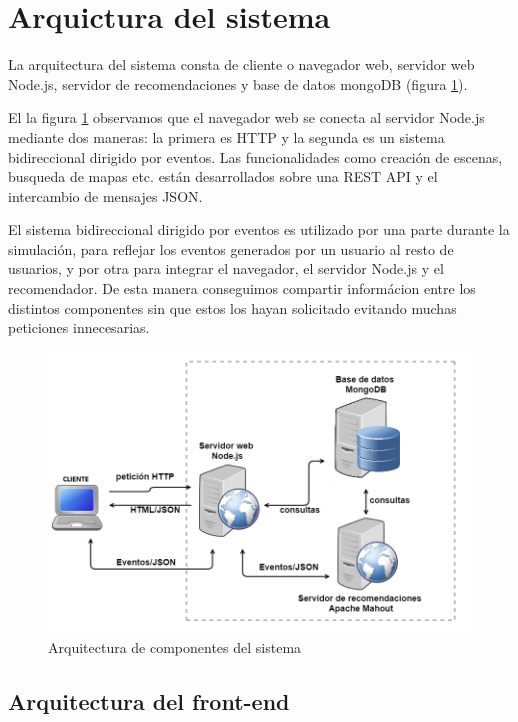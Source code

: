 \newpage


\section{Arquictura del sistema}


La arquitectura del sistema consta de cliente o navegador web, servidor web Node.js, servidor de recomendaciones y base de datos mongoDB (figura \ref{arquitecturaComponentes}).

El la figura \ref{arquitecturaComponentes} observamos que el navegador web se conecta al servidor Node.js mediante dos maneras: la primera es HTTP y la segunda es un sistema bidireccional dirigido por eventos. Las funcionalidades como creación de escenas, busqueda de mapas etc. están desarrollados sobre una REST API y el intercambio de mensajes JSON.

El sistema bidireccional dirigido por eventos es utilizado por una parte durante la simulación, para reflejar los eventos generados por un usuario al resto de usuarios, y por otra para integrar el navegador, el servidor Node.js y el recomendador. De esta manera conseguimos compartir informácion entre los distintos componentes sin que estos los hayan solicitado evitando muchas peticiones innecesarias.

\begin{figure}[H]
\centering\includegraphics[scale=0.55]{imagenes/arquitectura-componentes.png}
\caption{Arquitectura de componentes del sistema}
\label{arquitecturaComponentes}
\end{figure}

\newpage


\subsection{Arquitectura del front-end}


